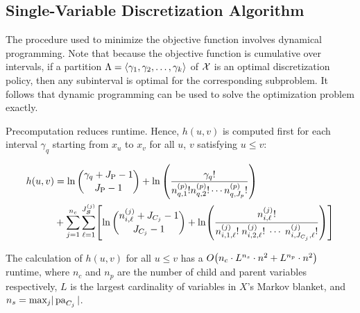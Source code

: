 

\subsection{Single-Variable Discretization Algorithm}
\label{subsec:algo}

The procedure used to minimize the objective function involves dynamical programming.
Note that because the objective function is cumulative over intervals, if a partition $\Lambda = \langle \gamma_1, \gamma_2, \ldots, \gamma_k \rangle$ of $\mathcal{X}$ is an optimal discretization policy, then any subinterval is optimal for the corresponding subproblem.
It follows that dynamic programming can be used to solve the optimization problem exactly.

Precomputation reduces runtime.
Hence, $h(u,v)$ is computed first for each interval $\gamma_q$ starting from $x_{u}$ to $x_{v}$ for all $u$, $v$ satisfying $u \leq v$:

\begin{small}
  \begin{equation}
  \label{eqn:h_function}
  \begin{aligned}
  h(u,v) &=  \ln {{\gamma_{q} + J_\text{P} - 1}\choose{J_\text{P}-1}} + \ln \left( { {{\gamma_q}!}\over{ {n^{(p)}_{q,1} !} {n^{(p)}_{q,2} !} \cdots {n^{(p)}_{q,J_p} !}} } \right) \\
  & + \sum_{j=1}^{n_c} \sum_{\ell=1}^{J^{(j)}_{\bm{S}}} \brock{
    { \ln
            {{n^{(j)}_{i,\ell} + J_{C_j} - 1}\choose{J_{C_j}-1}}}
      +
      \ln \paren{ {
            \frac{
              {n^{(j)}_{i,\ell}}!
            }{
              {n^{(j)}_{i,1,\ell}!} \; {n^{(j)}_{i,2,\ell}!} \; \cdots \; {n^{(j)}_{i,J_{C_j},\ell}!}
            }
          }
          } }
  \end{aligned}
  \end{equation}
\end{small}

The calculation of $h(u,v)$ for all $u \leq v$ has a $\bigo \paren{ n_c \cdot {L}^{n_s} \cdot n^2 + {L}^{n_p} \cdot n^2 }$ runtime, where $n_c$ and $n_p$ are the number of child and parent variables respectively, $L$ is the largest cardinality of variables in $X$'s Markov blanket, and $n_s = \text{max}_j  |\operatorname{pa}_{C_j}|$.


